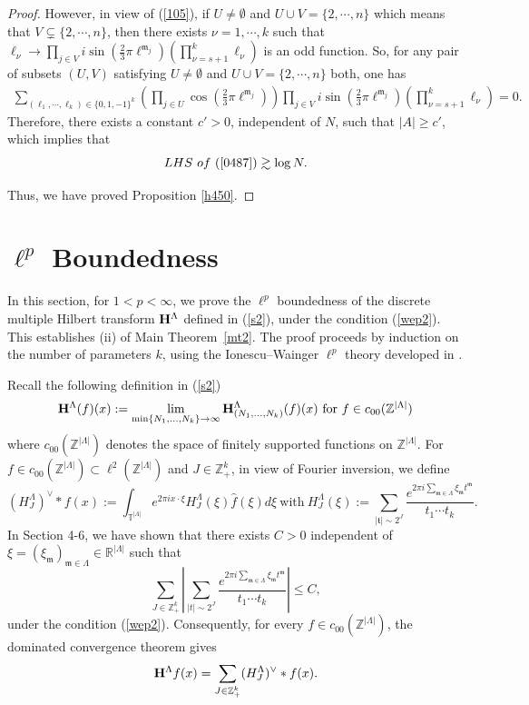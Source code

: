 \documentclass[11 pt,letterpaper]{amsart}
\theoremstyle{plain}
\theoremstyle{definition}
\theoremstyle{remark} \theoremstyle{exam} \theoremstyle{ob}
\numberwithin{equation}{section}
\begin{document}
\begin{proof}
However, in view of (\ref{105}), if  $U\ne \emptyset$ and $U\cup V=\{2,\cdots,n\}$ which means that $V\subsetneq \{2,\cdots,n\}$, then there exists  $\nu=1,\cdots,k$ such that
$\ell_\nu\rightarrow \prod_{j\in V} i \sin \left(\frac{2}{3}\pi 
  \ell^{\mathfrak{m}_j}\right)\left(\prod_{\nu=s+1}^k \ell_{\nu}\right)$ is an odd function. So, for any pair of subsets $(U,V)$ satisfying $U\ne\emptyset$ and  $U\cup V=\{2,\cdots,n\}$ both, one has
\begin{align}
\sum_{(\ell_1,\cdots,\ell_k)\in\{0,1,-1\}^k}  \left(\prod_{j\in U} \cos \left(\frac{2}{3}\pi 
  \ell^{\mathfrak{m}_j}\right)\right)\prod_{j\in V}i \sin \left(\frac{2}{3}\pi 
  \ell^{\mathfrak{m}_j}\right)\left(\prod_{\nu=s+1}^k \ell_{\nu}\right)=0.\end{align}
 Therefore, there exists a constant $c'>0$, independent of $N$, such that $|A|\ge c'$, which implies that $$LHS\  of\  (\ref{0487}) \gtrsim \log N.$$
 
Thus, we have proved Proposition \ref{h450}.
\end{proof}








\section{$\ell^p$ Boundedness}\label{sec6}
In this section, for $1<p<\infty$, we prove the $\ell^p$ boundedness of  the discrete multiple Hilbert transform
  ${\bf H}^{\Lambda}$ defined in (\ref{s2}), under the condition  (\ref{wep2}).
This establishes  (ii) of Main Theorem~\ref{mt2}. The proof proceeds by induction on the number of parameters $k$, using the Ionescu--Wainger $\ell^p$ theory developed in \cite{IW}.

Recall the following definition in (\ref{s2}) 	$${\bf H}^{\Lambda}(f)(x) := \lim_{\min\{N_1, \dots, N_k\} \to \infty} {\bf H}^{\Lambda}_{(N_1, \dots, N_k)}(f)(x) \ \text{for $f\in c_{00}(\mathbb{Z}^{|\Lambda|})$}$$
where $ c_{00}(\mathbb{Z}^{|\Lambda|})$ denotes the space of finitely supported  functions on  $\mathbb{Z}^{|\Lambda|}$.  
For $f\in c_{00}(\mathbb{Z}^{|\Lambda|}) \subset \ell^2(\mathbb{Z}^{|\Lambda|})$ and $J\in \mathbb{Z}_+^k$, in view of  Fourier inversion,  we define
$$  (H_J^{\Lambda})^{\vee}*f(x):=\int_{\mathbb{T}^{|\Lambda|}} e^{2\pi i x\cdot \xi}H^{\Lambda}_J(\xi)\widehat{f}(\xi)d\xi\ \text{with}\ H^{\Lambda}_J(\xi):=\sum_{|\mathfrak{t}|\sim 2^{J}} \frac{e^{2\pi i \sum_{\mathfrak{m}\in \Lambda}\xi_{\mathfrak{m}} t^{\mathfrak{m}}}}{t_1\cdots t_k}. $$
In Section 4-6, we have shown that  there exists $C>0$ independent of $\xi=(\xi_{\mathfrak{m}})_{\mathfrak{m}\in \Lambda}\in \mathbb{R}^{|\Lambda|}$ such that
$$\sum_{J\in \mathbb{Z}_+^{k}} \left|\sum_{|t|\sim 2^J}\frac{  e^{2\pi i \sum_{\mathfrak{m}\in\Lambda} \xi_{\mathfrak{m}}t^\mathfrak{m}} }{t_1\cdots t_k}\right|\le C,$$
under the condition  (\ref{wep2}).  Consequently, for every \(f\in c_{00}(\mathbb{Z}^{|\Lambda|})\), the dominated convergence theorem gives  $${\bf H}^{\Lambda}f(x)=\sum_{J\in \mathbb{Z}_+^{k}} (H_J^{\Lambda})^{\vee}*f(x).$$ 
\end{document}
